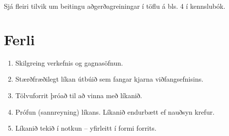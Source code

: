 \begin{aths}Sjá fleiri tilvik um beitingu aðgerðagreiningar í töflu á bls. 4 í kennslubók. \end{aths}

\section{Ferli}

\begin{enumerate} 
\item Skilgreing verkefnis og gagnasöfnun. 
\item Stærðfræðilegt líkan útbúið sem fangar kjarna viðfangsefnisins. 
\item Tölvuforrit þróað til að vinna með líkanið. 
\item Prófun (sannreyning) líkans. Líkanið endurbætt ef nauðsyn krefur. 
\item Líkanið tekið í notkun -- yfirleitt í formi forrits. 
\end{enumerate} 
 
